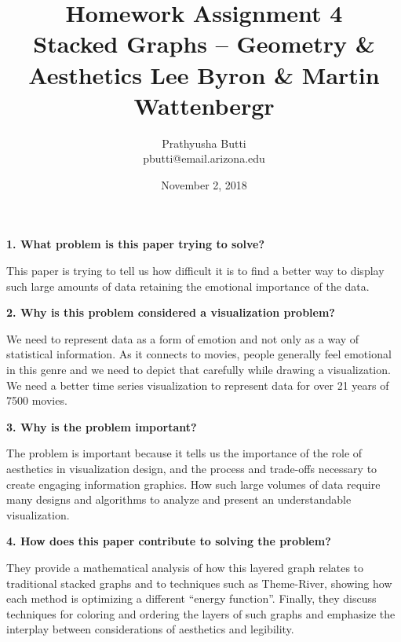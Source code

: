 \documentclass{article}[12pt]
\begin{document}
\title{Homework Assignment 4 \\
   \large Stacked Graphs -- Geometry \& Aesthetics
Lee Byron \& Martin Wattenbergr \\}
\date{November 2, 2018}

\author{
   Prathyusha Butti \\
   pbutti@email.arizona.edu
}

\maketitle

\noindent
{\bf 1. What problem is this paper trying to solve?}

{
    This paper is trying to tell us how difficult it is to find a better way to display such large amounts of data retaining the emotional importance of the data.
}




\vspace{2ex}\noindent
{\bf 2. Why is this problem considered a visualization problem?}

{
   We need to represent data as a form of emotion and not only as a way of statistical information. As it connects to movies, people generally feel emotional in this genre and we need to depict that carefully while drawing a visualization. We need a better time series visualization to represent data for over 21 years of 7500 movies.
}




\vspace{2ex}\noindent
{\bf 3. Why is the problem important? }

{
    The problem is important because it tells us the importance of the role of aesthetics in visualization design, and the process and trade-offs necessary to create engaging information graphics. How such large volumes of data require many designs and algorithms to analyze and present an understandable visualization.  
}




\vspace{2ex}\noindent
{ \bf 4. How does this paper contribute to solving the problem? }

{
    They provide a mathematical analysis of how this layered graph relates to traditional stacked graphs and to techniques such as Theme-River, showing how each method is optimizing a different “energy function”. Finally, they discuss techniques for coloring and ordering the layers of such graphs and emphasize the interplay between considerations of aesthetics and legibility. 
    
}
\end{document}
